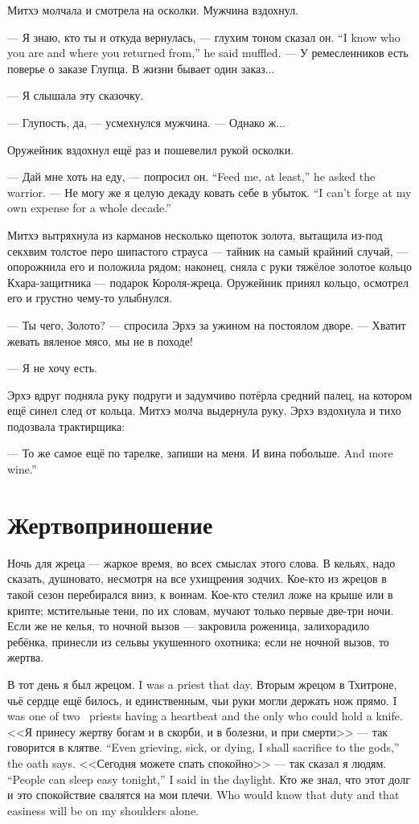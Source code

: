 Митхэ молчала и смотрела на осколки.
Мужчина вздохнул.

{--- Я знаю, кто ты и откуда вернулась, --- глухим тоном сказал он.}
{``I know who you are and where you returned from,'' he said muffled.}
--- У ремесленников есть поверье о заказе Глупца.
В жизни бывает один заказ...

--- Я слышала эту сказочку.

--- Глупость, да, --- усмехнулся мужчина.
--- Однако ж...

Оружейник вздохнул ещё раз и пошевелил рукой осколки.

{--- Дай мне хоть на еду, --- попросил он.}
{``Feed me, at least,'' he asked the warrior.}
{--- Не могу же я целую декаду ковать себе в убыток.}
{``I can't forge at my own expense for a whole decade.''}

Митхэ вытряхнула из карманов несколько щепоток золота, вытащила из-под секхвим толстое перо шипастого страуса --- тайник на самый крайний случай, --- опорожнила его и положила рядом;
наконец, сняла с руки тяжёлое золотое кольцо Кхара-защитника --- подарок Короля-жреца.
Оружейник принял кольцо, осмотрел его и грустно чему-то улыбнулся.

--- Ты чего, Золото? --- спросила Эрхэ за ужином на постоялом дворе.
--- Хватит жевать вяленое мясо, мы не в походе!

--- Я не хочу есть.

Эрхэ вдруг подняла руку подруги и задумчиво потёрла средний палец, на котором ещё синел след от кольца.
Митхэ молча выдернула руку.
Эрхэ вздохнула и тихо подозвала трактирщика:

--- То же самое ещё по тарелке, запиши на меня.
{И вина побольше.}
{And more wine.''}

\section{Жертвоприношение}

Ночь для жреца --- жаркое время, во всех смыслах этого слова.
В кельях, надо сказать, душновато, несмотря на все ухищрения зодчих.
Кое-кто из жрецов в такой сезон перебирался вниз, к воинам.
Кое-кто стелил ложе на крыше или в крипте;
мстительные тени, по их словам, мучают только первые две-три ночи.
Если же не келья, то ночной вызов --- закровила роженица, залихорадило ребёнка, принесли из сельвы укушенного охотника;
если не ночной вызов, то жертва.

{В тот день я был жрецом.}
{I was a priest that day.}
{Вторым жрецом в Тхитроне, чьё сердце ещё билось, и единственным, чьи руки могли держать нож прямо.}
{I was one of two \Tchitron\ priests having a heartbeat and the only who could hold a knife.}
{<<Я принесу жертву богам и в скорби, и в болезни, и при смерти>> --- так говорится в клятве.}
{``Even grieving, sick, or dying, I shall sacrifice to the gods,'' the oath says.}
{<<Сегодня можете спать спокойно>> --- так сказал я людям.}
{``People can sleep easy tonight,'' I said in the daylight.}
{Кто же знал, что этот долг и это спокойствие свалятся на мои плечи.}
{Who would know that duty and that easiness will be on my shoulders alone.}

